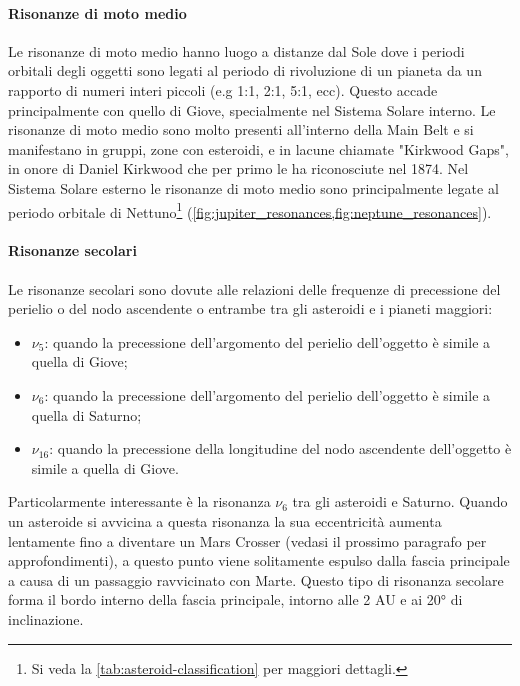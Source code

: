 \documentclass[a4paper,11pt,openright]{book}
\begin{document}
\paragraph*{Risonanze di moto medio} 
Le risonanze di moto medio hanno luogo a distanze dal Sole dove i periodi orbitali degli oggetti sono legati al periodo di rivoluzione di un pianeta da un rapporto di numeri interi piccoli (e.g 1:1, 2:1, 5:1, ecc). Questo accade principalmente con quello di Giove, specialmente nel Sistema Solare interno. Le risonanze di moto medio sono molto presenti all'interno della Main Belt e si manifestano in gruppi, zone con esteroidi, e in lacune chiamate "Kirkwood Gaps", in onore di Daniel Kirkwood che per primo le ha riconosciute nel 1874. Nel Sistema Solare esterno le risonanze di moto medio sono principalmente legate al periodo orbitale di Nettuno\footnote{Si veda la \cref{tab:asteroid-classification} per maggiori dettagli.} (\cref{fig:jupiter_resonances,fig:neptune_resonances}).

\paragraph*{Risonanze secolari}
Le risonanze secolari sono dovute alle relazioni delle frequenze di precessione del perielio o del nodo ascendente o entrambe tra gli asteroidi e i pianeti maggiori:
\begin{itemize}
    \item $\nu_5$: quando la precessione dell'argomento del perielio dell'oggetto è simile a quella di Giove;
    \item $\nu_6$: quando la precessione dell'argomento del perielio dell'oggetto è simile a quella di Saturno;
    \item $\nu_{16}$: quando la precessione della longitudine del nodo ascendente dell'oggetto è simile a quella di Giove.
\end{itemize} 
Particolarmente interessante è la risonanza $\nu_6$ tra gli asteroidi e Saturno. Quando un asteroide si avvicina a questa risonanza la sua eccentricità aumenta lentamente fino a diventare un Mars Crosser (vedasi il prossimo paragrafo per approfondimenti), a questo punto viene solitamente espulso dalla fascia principale a causa di un passaggio ravvicinato con Marte. Questo tipo di risonanza secolare forma il bordo interno della fascia principale, intorno alle 2 AU e ai 20° di inclinazione.
\end{document}
